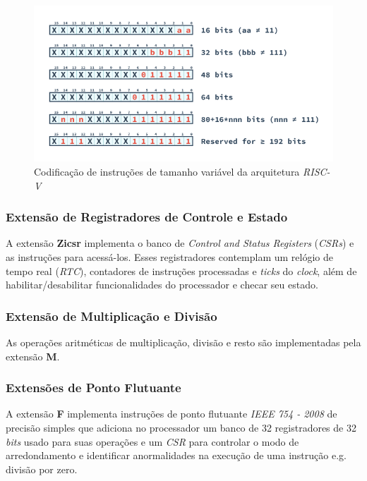     \begin{figure}[H]
    \centering
        \includegraphics[width=.8\linewidth]{../images/RV_InstructionLength.png}
        \caption{Codificação de instruções de tamanho variável da arquitetura
                    \textit{RISC-V}}\label{fig:riscv_var_length}
    \end{figure}


        \subsubsection{Extensão de Registradores de Controle e Estado}
        { A extensão \textbf{Zicsr} implementa o banco de \textit{Control and
            Status Registers} (\textit{CSRs}) e as instruções para acessá-los.
            Esses registradores contemplam um relógio de tempo real (\textit{RTC}),
            contadores de instruções processadas e \textit{ticks} do \textit{clock},
            além de habilitar/desabilitar funcionalidades do processador e checar
            seu estado.
        }

        \subsubsection{Extensão de Multiplicação e Divisão}
        { As operações aritméticas de multiplicação, divisão e resto são
            implementadas pela extensão \textbf{M}.
        }

        \subsubsection{Extensões de Ponto Flutuante}
        { A extensão \textbf{F} implementa instruções de ponto flutuante
            \textit{IEEE 754 - 2008} de precisão simples que adiciona
            no processador um banco de 32 registradores de 32 \textit{bits}
            usado para suas operações e um \textit{CSR} para controlar o modo
            de arredondamento e identificar anormalidades na execução de uma
            instrução e.g. divisão por zero.
        }

